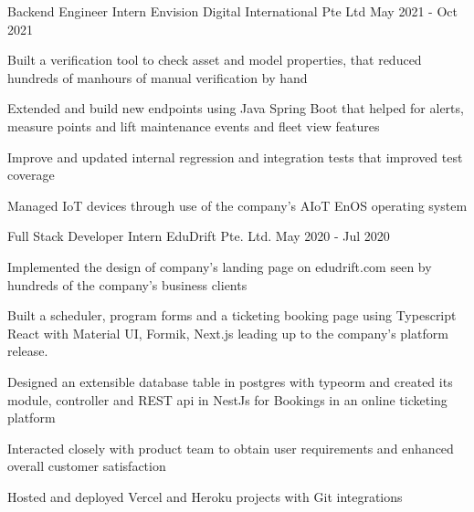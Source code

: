 

\begin{cventries}

  \cventry
    {Backend Engineer Intern} %
    {Envision Digital International Pte Ltd} %
    {} %
    {May 2021 - Oct 2021} %
    {
      \begin{cvitems} %
        \item {Built a verification tool to check asset and model properties, that reduced hundreds of manhours of manual verification by hand}
        \item {Extended and build new endpoints using Java Spring Boot that helped for alerts, measure points and lift maintenance events and fleet view features}
        \item {Improve and updated internal regression and integration tests that improved test coverage}
        \item {Managed IoT devices through use of the company's AIoT EnOS operating system}
      \end{cvitems}
    }

  \cventry
    {Full Stack Developer Intern} %
    {EduDrift Pte. Ltd.} %
    {} %
    {May 2020 - Jul 2020} %
    {
      \begin{cvitems} %
        \item {Implemented the design of company's landing page on \textcolor{eduDft-darkblue}{edudrift.com} seen by hundreds of the company's business clients}
        \item {Built a scheduler, program forms and a ticketing booking page using Typescript React with Material UI, Formik, Next.js leading up to the company's platform release.}
        \item {Designed an extensible database table in postgres with typeorm and created its module, controller and REST api in NestJs for Bookings in an online ticketing platform}
        \item {Interacted closely with product team to obtain user requirements and enhanced overall customer satisfaction}
        \item {Hosted and deployed Vercel and Heroku projects with Git integrations}
      \end{cvitems}
    }

\end{cventries}
